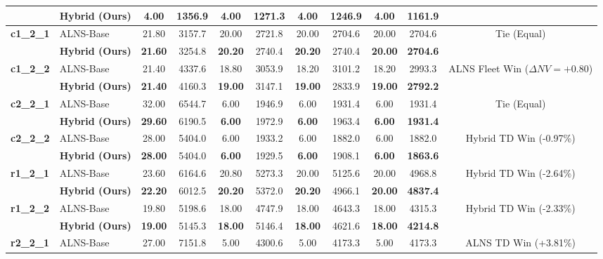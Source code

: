 \begin{table}[!htbp]
\begin{tabular*}{\textwidth}{@{\extracolsep{\fill}} ll cccccc cc c @{}}
 & \textbf{Hybrid (Ours)} & \textbf{4.00} & 1356.9 & \textbf{4.00} & 1271.3 & \textbf{4.00} & 1246.9 & \textbf{4.00} & \textbf{1161.9} & \\
\midrule
\multirow{2}{*}{\textbf{c1\_2\_1}} & ALNS-Base & 21.80 & 3157.7 & 20.00 & 2721.8 & 20.00 & 2704.6 & 20.00 & 2704.6 & \multirow{2}{*}{Tie (Equal)} \\
 & \textbf{Hybrid (Ours)} & \textbf{21.60} & 3254.8 & \textbf{20.20} & 2740.4 & \textbf{20.20} & 2740.4 & \textbf{20.00} & \textbf{2704.6} & \\
\midrule
\multirow{2}{*}{\textbf{c1\_2\_2}} & ALNS-Base & 21.40 & 4337.6 & 18.80 & 3053.9 & 18.20 & 3101.2 & 18.20 & 2993.3 & \multirow{2}{*}{ALNS Fleet Win ($\Delta NV=+0.80$)} \\
 & \textbf{Hybrid (Ours)} & \textbf{21.40} & 4160.3 & \textbf{19.00} & 3147.1 & \textbf{19.00} & 2833.9 & \textbf{19.00} & \textbf{2792.2} & \\
\midrule
\multirow{2}{*}{\textbf{c2\_2\_1}} & ALNS-Base & 32.00 & 6544.7 & 6.00 & 1946.9 & 6.00 & 1931.4 & 6.00 & 1931.4 & \multirow{2}{*}{Tie (Equal)} \\
 & \textbf{Hybrid (Ours)} & \textbf{29.60} & 6190.5 & \textbf{6.00} & 1972.9 & \textbf{6.00} & 1963.4 & \textbf{6.00} & \textbf{1931.4} & \\
\midrule
\multirow{2}{*}{\textbf{c2\_2\_2}} & ALNS-Base & 28.00 & 5404.0 & 6.00 & 1933.2 & 6.00 & 1882.0 & 6.00 & 1882.0 & \multirow{2}{*}{Hybrid TD Win (-0.97\%)} \\
 & \textbf{Hybrid (Ours)} & \textbf{28.00} & 5404.0 & \textbf{6.00} & 1929.5 & \textbf{6.00} & 1908.1 & \textbf{6.00} & \textbf{1863.6} & \\
\midrule
\multirow{2}{*}{\textbf{r1\_2\_1}} & ALNS-Base & 23.60 & 6164.6 & 20.80 & 5273.3 & 20.00 & 5125.6 & 20.00 & 4968.8 & \multirow{2}{*}{Hybrid TD Win (-2.64\%)} \\
 & \textbf{Hybrid (Ours)} & \textbf{22.20} & 6012.5 & \textbf{20.20} & 5372.0 & \textbf{20.20} & 4966.1 & \textbf{20.00} & \textbf{4837.4} & \\
\midrule
\multirow{2}{*}{\textbf{r1\_2\_2}} & ALNS-Base & 19.80 & 5198.6 & 18.00 & 4747.9 & 18.00 & 4643.3 & 18.00 & 4315.3 & \multirow{2}{*}{Hybrid TD Win (-2.33\%)} \\
 & \textbf{Hybrid (Ours)} & \textbf{19.00} & 5145.3 & \textbf{18.00} & 5146.4 & \textbf{18.00} & 4621.6 & \textbf{18.00} & \textbf{4214.8} & \\
\midrule
\multirow{2}{*}{\textbf{r2\_2\_1}} & ALNS-Base & 27.00 & 7151.8 & 5.00 & 4300.6 & 5.00 & 4173.3 & 5.00 & 4173.3 & \multirow{2}{*}{ALNS TD Win (+3.81\%)} \\

\end{tabular*}
\end{table}
